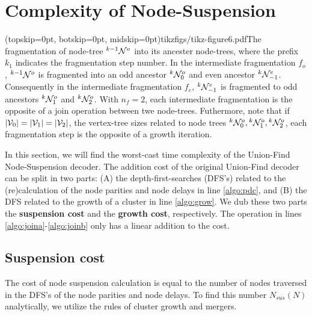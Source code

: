 
\section{Complexity of Node-Suspension}\label{sec:complexity}

\Figure[htb](topskip=0pt, botskip=0pt, midskip=0pt){tikzfigs/tikz-figure6.pdf}{The fragmentation of node-tree ${}^{k-1}\mathcal{N}^o$ into its ancester node-trees, where the prefix $k_1$ indicates the fragmentation step number. In the intermediate fragmentation $f_o$, ${}^{k-1}\mathcal{N}^o$ is fragmented into an odd ancestor ${}^{k}\mathcal{N}^o_0$ and even ancestor ${}^{k}\mathcal{N}^e_{-1}$. Consequently in the intermediate fragmentation $f_e$, ${}^{k}\mathcal{N}^e_{-1}$ is fragmented to odd ancestors ${}^{k}\mathcal{N}^o_{1}$ and ${}^{k}\mathcal{N}^o_{2}$. With $n_f=2$, each intermediate fragmentation is the opposite of a join operation between twe node-trees. Futhermore, note that if $\lvert\mathcal{V}_0\rvert = \lvert\mathcal{V}_1\rvert = \lvert\mathcal{V}_2\rvert$, the vertex-tree sizes related to node trees ${}^{k}\mathcal{N}^o_0, {}^{k}\mathcal{N}^o_1, {}^{k}\mathcal{N}^o_2$, each fragmentation step is the opposite of a growth iteration. \label{fig6}}

In this section, we will find the worst-cast time complexity of the Union-Find Node-Suspension decoder. The addition cost of the original Union-Find decoder can be split in two parts: (A) the depth-first-searches (DFS's) related to the (re)calculation of the node parities and node delays in line \ref{algo:pdc}, and (B) the DFS related to the growth of a cluster in line \ref{algo:grow}. We dub these two parts the \textbf{suspension cost} and the \textbf{growth cost}, respectively. The  operation in lines \ref{algo:joina}-\ref{algo:joinb} only has a linear addition to the cost.

\subsection{Suspension cost}\label{sec:suscomplexity}

The cost of node suspension calculation is equal to the number of nodes traversed in the DFS's of the node parities and node delays. To find this number $N_{sus}(N)$ analytically, we utilize the rules of cluster growth and mergers.



